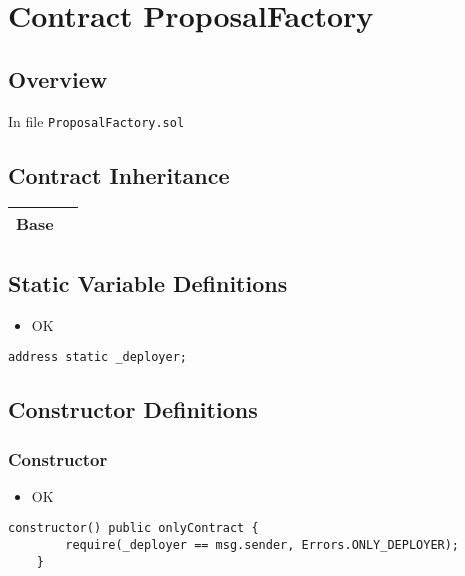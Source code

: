 
\chapter{Contract ProposalFactory}

\minitoc

\section{Overview}


In file {\tt ProposalFactory.sol}

\section{Contract Inheritance}


\noindent\begin{tabular}{|l|p{5cm}|}\hline
Base & \\\hline
\end{tabular}


\section{Static Variable Definitions}

\begin{itemize}
\item OK
\end{itemize}


\begin{lstlisting}[firstnumber=14]
    address static _deployer;
\end{lstlisting}

\section{Constructor Definitions}


\subsection{Constructor}

\begin{itemize}
\item OK
\end{itemize}

\begin{lstlisting}[firstnumber=16]
    constructor() public onlyContract {
        require(_deployer == msg.sender, Errors.ONLY_DEPLOYER);
    }
\end{lstlisting}


